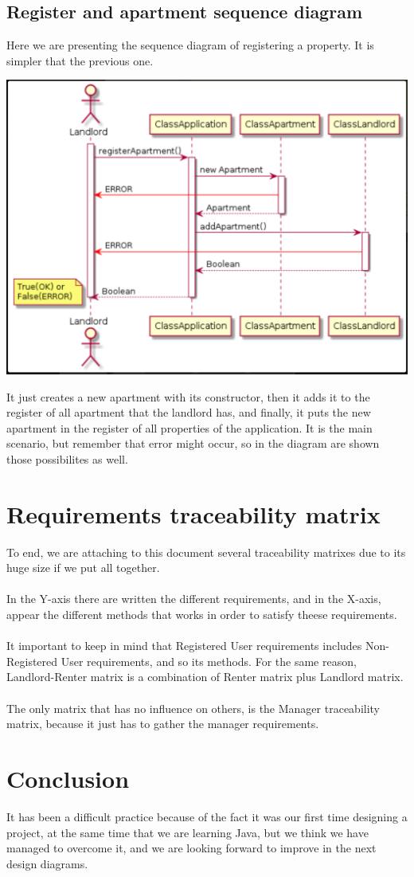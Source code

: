 \documentclass[12pt]{article}
\begin{document}
\subsection{Register and apartment sequence diagram}
Here we are presenting the sequence diagram of registering a property. It is simpler that the previous one.
\begin{center}
	\includegraphics[scale=1]{sequence1.PNG}
\end{center}
It just creates a new apartment with its constructor, then it adds it to the register of all apartment that the landlord has, and finally, it puts the new apartment in the register of all properties of the application. It is the main scenario, but remember that error might occur, so in the diagram are shown those possibilites as well.

\section{Requirements traceability matrix}
To end, we are attaching to this document several traceability matrixes due to its huge size if we put all together.\\\\
In the Y-axis there are written the different requirements, and in the X-axis, appear the different methods that works in order to satisfy theese requirements.\\\\
It important to keep in mind that Registered User requirements includes Non-Registered User requirements, and so its methods. For the same reason, Landlord-Renter matrix is a combination of Renter matrix plus Landlord matrix.\\\\
The only matrix that has no influence on others, is the Manager traceability matrix, because it just has to gather the manager requirements.

\section{Conclusion}
It has been a difficult practice because of the fact it was our first time designing a project, at the same time that we are learning Java, but we think we have managed to overcome it, and we are looking forward to improve in the next design diagrams.
\end{document}

